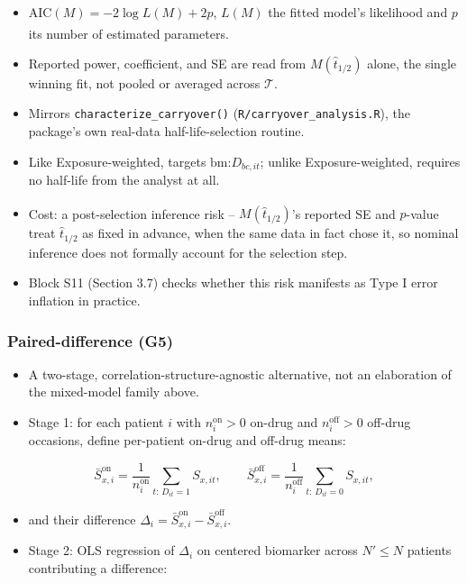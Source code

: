 \documentclass[
  11pt,
]{article}
\providecommand{\tightlist}{%
  \setlength{\itemsep}{0pt}\setlength{\parskip}{0pt}}
\begin{document}
\begin{itemize}
\tightlist
\item
  \(\text{AIC}(M) = -2\log L(M) + 2p\), \(L(M)\) the fitted model's
  likelihood and \(p\) its number of estimated parameters\textsuperscript{}.
\item
  Reported power, coefficient, and SE are read from
  \(M(\hat{t}_{1/2})\) alone, the single winning fit, not pooled or
  averaged across \(\mathcal{T}\).
\item
  Mirrors \texttt{characterize\_carryover()} (\texttt{R/carryover\_analysis.R}), the
  package's own real-data half-life-selection routine.
\item
  Like Exposure-weighted, targets \(\text{bm:}D_{bc,it}\); unlike
  Exposure-weighted, requires no half-life from the analyst at all.
\item
  Cost: a post-selection inference risk\textsuperscript{} --
  \(M(\hat{t}_{1/2})\)'s reported SE and \(p\)-value treat
  \(\hat{t}_{1/2}\) as fixed in advance, when the same data in fact
  chose it, so nominal inference does not formally account for the
  selection step.
\item
  Block S11 (Section 3.7) checks whether this risk manifests as Type
  I error inflation in practice.
\end{itemize}

\subsubsection{Paired-difference (G5)}\label{paired-difference-g5}

\begin{itemize}
\tightlist
\item
  A two-stage, correlation-structure-agnostic alternative, not an
  elaboration of the mixed-model family above.
\item
  Stage 1: for each patient \(i\) with \(n_i^{\text{on}} > 0\) on-drug and
  \(n_i^{\text{off}} > 0\) off-drug occasions, define per-patient
  on-drug and off-drug means:
\end{itemize}

\[
\bar{S}_{x,i}^{\text{on}} = \frac{1}{n_i^{\text{on}}}
  \sum_{t:\, D_{it}=1} S_{x,it}, \qquad
\bar{S}_{x,i}^{\text{off}} = \frac{1}{n_i^{\text{off}}}
  \sum_{t:\, D_{it}=0} S_{x,it},
\]

\begin{itemize}
\tightlist
\item
  and their difference
  \(\Delta_i = \bar{S}_{x,i}^{\text{on}} - \bar{S}_{x,i}^{\text{off}}\).
\item
  Stage 2: OLS regression of \(\Delta_i\) on centered biomarker across
  \(N' \leq N\) patients contributing a difference:
\end{itemize}
\end{document}
